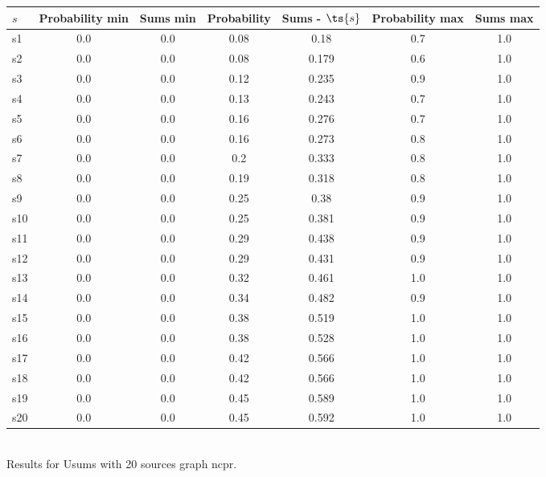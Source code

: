 \documentclass{article}
\begin{document}
\noindent\begin{tabular}{|l|c|c|c|c|c|c|}
\hline
$s$& Probability min & Sums min & Probability & Sums - $\ts{s}$ & Probability max & Sums max\\
\hline
s1 &0.0 & 0.0 & 0.08 & 0.18 & 0.7 & 1.0\\
\hline
s2 &0.0 & 0.0 & 0.08 & 0.179 & 0.6 & 1.0\\
\hline
s3 &0.0 & 0.0 & 0.12 & 0.235 & 0.9 & 1.0\\
\hline
s4 &0.0 & 0.0 & 0.13 & 0.243 & 0.7 & 1.0\\
\hline
s5 &0.0 & 0.0 & 0.16 & 0.276 & 0.7 & 1.0\\
\hline
s6 &0.0 & 0.0 & 0.16 & 0.273 & 0.8 & 1.0\\
\hline
s7 &0.0 & 0.0 & 0.2 & 0.333 & 0.8 & 1.0\\
\hline
s8 &0.0 & 0.0 & 0.19 & 0.318 & 0.8 & 1.0\\
\hline
s9 &0.0 & 0.0 & 0.25 & 0.38 & 0.9 & 1.0\\
\hline
s10 &0.0 & 0.0 & 0.25 & 0.381 & 0.9 & 1.0\\
\hline
s11 &0.0 & 0.0 & 0.29 & 0.438 & 0.9 & 1.0\\
\hline
s12 &0.0 & 0.0 & 0.29 & 0.431 & 0.9 & 1.0\\
\hline
s13 &0.0 & 0.0 & 0.32 & 0.461 & 1.0 & 1.0\\
\hline
s14 &0.0 & 0.0 & 0.34 & 0.482 & 0.9 & 1.0\\
\hline
s15 &0.0 & 0.0 & 0.38 & 0.519 & 1.0 & 1.0\\
\hline
s16 &0.0 & 0.0 & 0.38 & 0.528 & 1.0 & 1.0\\
\hline
s17 &0.0 & 0.0 & 0.42 & 0.566 & 1.0 & 1.0\\
\hline
s18 &0.0 & 0.0 & 0.42 & 0.566 & 1.0 & 1.0\\
\hline
s19 &0.0 & 0.0 & 0.45 & 0.589 & 1.0 & 1.0\\
\hline
s20 &0.0 & 0.0 & 0.45 & 0.592 & 1.0 & 1.0\\
\hline
\end{tabular}\\

\noindent Results for Usums with 20 sources graph ncpr.
\end{document}
